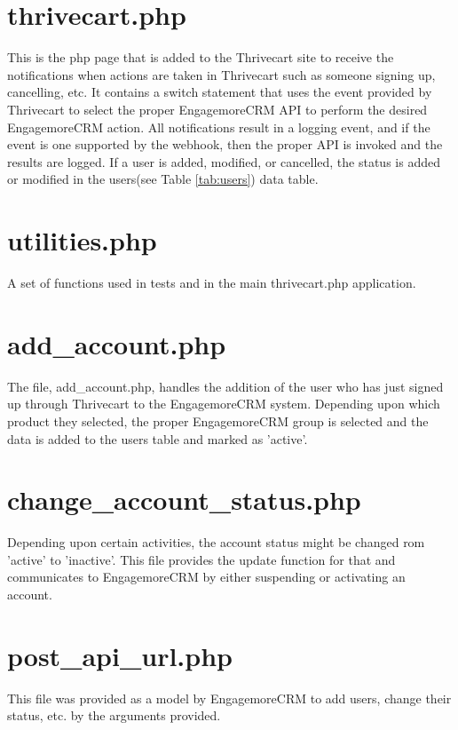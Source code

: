 \documentclass[final,letterpaper,12pt]{article}
\begin{document}
\begin{appendices}


\section{thrivecart.php}
\noindent This is the php page that is added to the Thrivecart site to receive the notifications when actions are taken in Thrivecart such as someone signing up, cancelling, etc.  It contains a switch statement that uses the event provided by Thrivecart to select the proper EngagemoreCRM API to perform the desired EngagemoreCRM action.  All notifications result in a logging event, and if the event is one supported by the webhook, then the proper API is invoked and the results are logged.  If a user is added, modified, or cancelled, the status is added or modified in the users(see Table \ref{tab:users}) data table.



\section{utilities.php}
\noindent A set of functions used in tests and in the main thrivecart.php application.



\section{add\_account.php}
\noindent The file, add\_account.php, handles the addition of the user who has just signed up through Thrivecart to the EngagemoreCRM system.  Depending upon which product they selected, the proper EngagemoreCRM group is selected and the data is added to the users table and marked as 'active'.



\section{change\_account\_status.php}
\noindent Depending upon certain activities, the account status might be changed rom 'active' to 'inactive'.  This file provides the update function for that and communicates to EngagemoreCRM by either suspending or activating an account.



\section{post\_api\_url.php}
\noindent This file was provided as a model by EngagemoreCRM to add users, change their status, etc. by the arguments provided.


\end{appendices}
\end{document}
